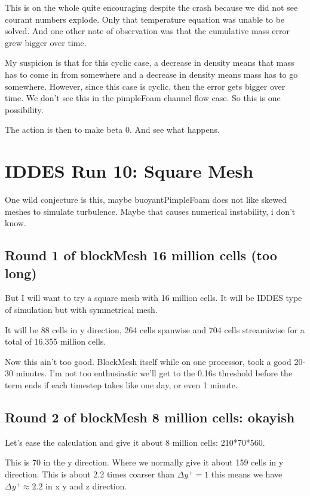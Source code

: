 \documentclass[12pt]{article}
\renewcommand{\_}{\kern-1.5pt\textunderscore\kern-1.5pt}
\begin{document}
This is on the whole quite encouraging despite the crash because we did not see courant numbers explode. Only that temperature equation was unable to be solved. And one other note of observation was that the cumulative mass error grew bigger over time.

My suspicion is that for this cyclic case, a decrease in density means that mass has to come in from somewhere and a decrease in density means mass has to go somewhere. However, since this case is cyclic, then the error gets bigger over time. We don't see this in the pimpleFoam channel flow case. So this is one possibility. 

The action is then to make beta 0. And see what happens.


\section{IDDES Run 10: Square Mesh}

One wild conjecture is this, maybe buoyantPimpleFoam does not like skewed meshes to simulate turbulence. Maybe that causes numerical instability, i don't know. 

\subsection{Round 1 of blockMesh 16 million cells (too long)}


But I will want to try a square mesh with 16 million cells. It will be IDDES type of simulation but with symmetrical mesh.


It will be 88 cells in y direction, 264 cells spanwise and 704 cells streamiwise for a total of 16.355 million cells.



Now this ain't too good. BlockMesh itself while on one processor, took a good 20-30 minutes. I'm not too enthusiastic we'll get to the 0.16s threshold before the term ends if each timestep takes like one day, or even 1 minute.

\subsection{Round 2 of blockMesh 8 million cells: okayish}

Let's ease the calculation and give it about 8 million cells:
210*70*560.

This is 70 in the y direction. Where we normally give it about 159 cells in y direction. This is about 2.2 times coarser than $\Delta {y}^{+} = 1$ this means we have $\Delta {y}^{+} \approx  2.2$ in x y and z direction.
\end{document}

